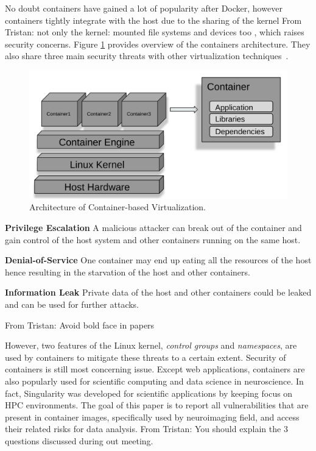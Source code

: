 \documentclass[a4paper,num-refs]{oup-contemporary}
\newcommand{\TG}[1]{\color{blue}From Tristan: #1 \color{black}}
\begin{document}
No doubt containers have gained a lot of popularity after Docker, however containers tightly
integrate with the host due to the sharing of the kernel \TG{not only the kernel: 
mounted file systems and devices too}, which raises security
concerns. Figure \ref{fig:container-overview} provides overview of the containers architecture.
They also share three main security threats with other virtualization
techniques~\cite{gantikow2016providing}.

\begin{figure}
  \centering
  \includegraphics[width=.7\columnwidth]{Figures/container.png}
  \caption{Architecture of Container-based
                Virtualization.}
  \label{fig:container-overview}
\end{figure}

\textbf{Privilege Escalation} A malicious attacker can break out of the container
and gain control of the host system and other containers running on the same host.

\textbf{Denial-of-Service} One container may end up eating all the resources of the
host hence resulting in the starvation of the host and other containers.

\textbf{Information Leak} Private data of the host and other containers could be
leaked and can be used for further attacks.

\TG{Avoid bold face in papers}

However, two features of the Linux kernel, \textit{control groups} and \textit{namespaces},
are used by containers to mitigate these threats to a certain extent. Security
of containers is still most concerning issue.
Except web applications, containers are also popularly used for scientific computing
and data science in neuroscience. In fact, Singularity was developed for scientific applications
by keeping focus on HPC environments.
The goal of this paper is to report all vulnerabilities that are present in
container images, specifically used by neuroimaging field, and access their
related risks for data analysis. \TG{You should explain the 3 questions discussed during out meeting.}
\end{document}
